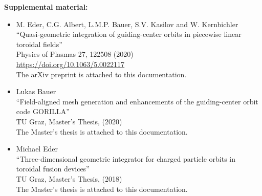 \documentclass{TheMartianReport}
\begin{document}
\textbf{Supplemental material:}
\begin{itemize}
\item M. Eder, C.G. Albert, L.M.P. Bauer, S.V. Kasilov and  W. Kernbichler\\
``Quasi-geometric integration of guiding-center orbits in piecewise linear toroidal fields''\\
Physics of Plasmas 27,  122508 (2020)\\
\url{https://doi.org/10.1063/5.0022117}\\
The arXiv preprint is attached to this documentation.

\item Lukas Bauer\\
``Field-aligned mesh generation and enhancements of the guiding-center orbit code GORILLA'' \\
TU Graz, Master's Thesis, (2020)\\
The Master's thesis is attached to this documentation.

\item Michael Eder\\
``Three-dimensional geometric integrator for charged particle orbits in toroidal fusion devices'' \\
TU Graz, Master's Thesis, (2018)\\
The Master's thesis is attached to this documentation.
\end{itemize}
\end{document}
